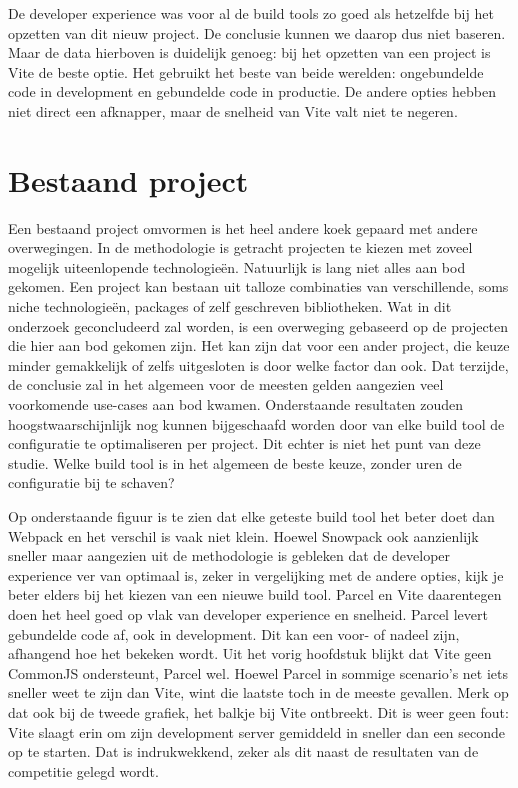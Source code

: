 De developer experience was voor al de build tools zo goed als hetzelfde bij het opzetten van dit nieuw project. De conclusie kunnen we daarop dus niet baseren. Maar de data hierboven is duidelijk genoeg: bij het opzetten van een project is Vite de beste optie. Het gebruikt het beste van beide werelden: ongebundelde code in development en gebundelde code in productie. De andere opties hebben niet direct een afknapper, maar de snelheid van Vite valt niet te negeren.

\section{Bestaand project}
Een bestaand project omvormen is het heel andere koek gepaard met andere overwegingen. In de methodologie is getracht projecten te kiezen met zoveel mogelijk uiteenlopende technologieën. Natuurlijk is lang niet alles aan bod gekomen. Een project kan bestaan uit talloze combinaties van verschillende, soms niche technologieën, packages of zelf geschreven bibliotheken. Wat in dit onderzoek geconcludeerd zal worden, is een overweging gebaseerd op de projecten die hier aan bod gekomen zijn. Het kan zijn dat voor een ander project, die keuze minder gemakkelijk of zelfs uitgesloten is door welke factor dan ook. Dat terzijde, de conclusie zal in het algemeen voor de meesten gelden aangezien veel voorkomende use-cases aan bod kwamen. Onderstaande resultaten zouden hoogstwaarschijnlijk nog kunnen bijgeschaafd worden door van elke build tool de configuratie te optimaliseren per project. Dit echter is niet het punt van deze studie. Welke build tool is in het algemeen de beste keuze, zonder uren de configuratie bij te schaven?

Op onderstaande figuur is te zien dat elke geteste build tool het beter doet dan Webpack en het verschil is vaak niet klein. Hoewel Snowpack ook aanzienlijk sneller maar aangezien uit de methodologie is gebleken dat de developer experience ver van optimaal is, zeker in vergelijking met de andere opties, kijk je beter elders bij het kiezen van een nieuwe build tool. Parcel en Vite daarentegen doen het heel goed op vlak van developer experience en snelheid. Parcel levert gebundelde code af, ook in development. Dit kan een voor- of nadeel zijn, afhangend hoe het bekeken wordt. Uit het vorig hoofdstuk blijkt dat Vite geen CommonJS ondersteunt, Parcel wel. Hoewel Parcel in sommige scenario’s net iets sneller weet te zijn dan Vite, wint die laatste toch in de meeste gevallen. Merk op dat ook bij de tweede grafiek, het balkje bij Vite ontbreekt. Dit is weer geen fout: Vite slaagt erin om zijn development server gemiddeld in sneller dan een seconde op te starten. Dat is indrukwekkend, zeker als dit naast de resultaten van de competitie gelegd wordt. 

